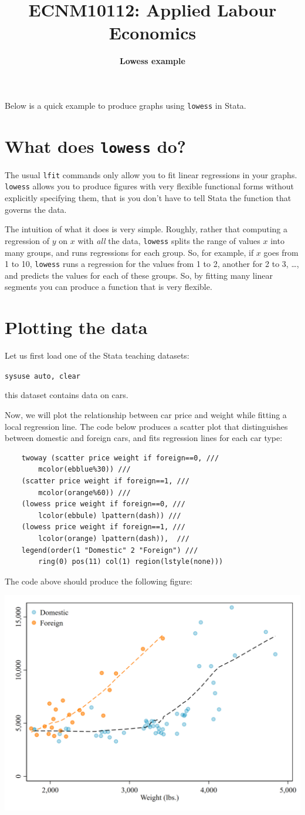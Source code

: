 \documentclass[a4paper, 11pt]{article}
\title{\large{\textbf{ECNM10112: Applied Labour Economics}}}
\author{\textbf{Lowess example}}
\date{}
\begin{document}
	\maketitle
	
Below is a quick example to produce graphs using {\tt lowess} in Stata. 

\section{What does {\tt lowess} do?}
The usual {\tt lfit} commands only allow you to fit linear regressions in your graphs. {\tt lowess} allows you to produce figures with very flexible functional forms without explicitly specifying them, that is you don't have to tell Stata the function that governs the data.

The intuition of what it does is very simple. Roughly, rather that computing a regression of $y$ on $x$ with \emph{all} the data, {\tt lowess} splits the range of values $x$ into many groups, and runs regressions for each group. So, for example, if $x$ goes from 1 to 10, {\tt lowess} runs a regression for the values from 1 to 2, another for 2 to 3, \dots,  and predicts the values for each of these groups.  So, by fitting many linear segments you can produce a function that is very flexible.
\section{Plotting the data}
\bitem 
\item Let us first load one of the Stata teaching datasets:

{\tt	sysuse auto, clear}

this dataset contains data on cars.
\item Now, we will plot the relationship between car price and weight while fitting a local regression line. The code below produces a scatter plot that distinguishes between domestic and foreign cars, and fits regression lines for each car type:
\begin{lstlisting}
	twoway (scatter price weight if foreign==0, ///
		mcolor(ebblue%30)) ///
	(scatter price weight if foreign==1, ///	
		mcolor(orange%60)) ///
	(lowess price weight if foreign==0, ///
		lcolor(ebbule) lpattern(dash)) ///
	(lowess price weight if foreign==1, ///
		lcolor(orange) lpattern(dash)),  ///
	legend(order(1 "Domestic" 2 "Foreign") ///
		ring(0) pos(11) col(1) region(lstyle(none)))
\end{lstlisting}
\eitem 
The code above should produce the following figure:

\centering\includegraphics[width=.7\textwidth]{lowes_example.png}
\end{document}

